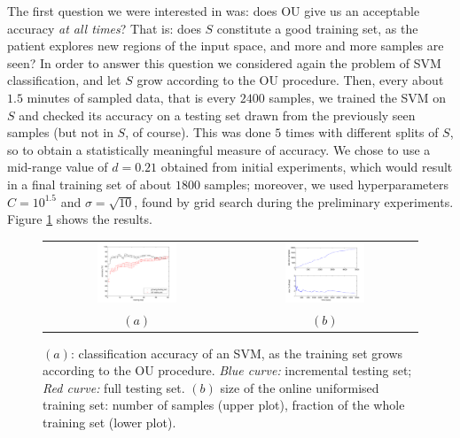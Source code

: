 The first question we were interested in was: does OU give us an
acceptable accuracy \emph{at all times}? That is: does $S$ constitute
a good training set, as the patient explores new regions of the input
space, and more and more samples are seen? In order to answer this
question we considered again the problem of SVM classification, and
let $S$ grow according to the OU procedure. Then, every about $1.5$
minutes of sampled data, that is every $2400$ samples, we trained the
SVM on $S$ and checked its accuracy on a testing set drawn from the
previously seen samples (but not in $S$, of course). This was done $5$
times with different splits of $S$, so to obtain a statistically
meaningful measure of accuracy. We chose to use a mid-range value of
$d = 0.21$ obtained from initial experiments, which would
result in a final training set of about $1800$ samples; moreover, we
used hyperparameters $C = 10^{1.5}$ and $\sigma = \sqrt{10}$, found by
grid search during the preliminary experiments. Figure \ref{fig:inc}
shows the results.

\begin{figure}[!ht] \centering
  \begin{tabular}{cc}
    \includegraphics[width=0.45\textwidth]{figs/fig_resInc_OU21} &
    \includegraphics[width=0.45\textwidth]{figs/fig_growth_OU21} \\
    $(a)$ & $(b)$ \\
  \end{tabular}
  \caption{$(a)$: classification accuracy of an SVM, as the training set
    grows according to the OU procedure. \emph{Blue curve:}
    incremental testing set; \emph{Red curve:} full testing set. $(b)$
    size of the online uniformised training set: number of samples
    (upper plot), fraction of the whole training set (lower plot).}
  \label{fig:inc}
\end{figure}

